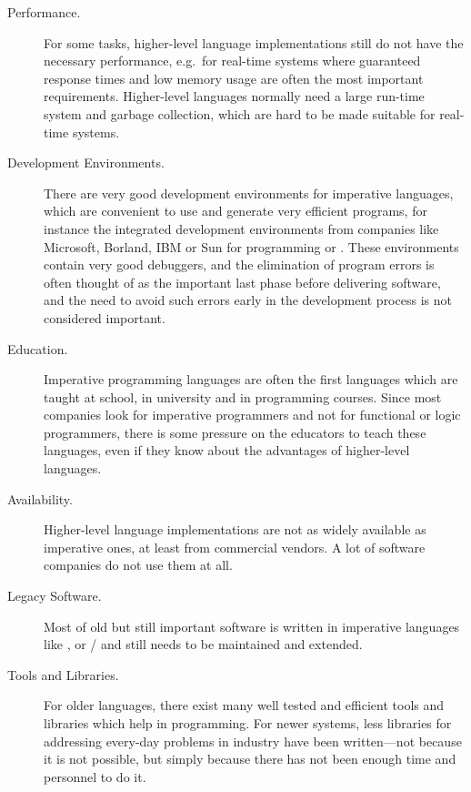 \begin{description}
\item[Performance.] For some tasks, higher-level
  language implementations still do not have the necessary
  performance, e.g.~for real-time systems
  where guaranteed response times and low memory usage are often the
  most important requirements.  Higher-level languages normally need a
  large run-time system and garbage
  collection, which are hard to be made
  suitable for real-time systems.
  
\item[Development Environments.] There
  are very good development environments for imperative languages,
  which are convenient to use and generate very efficient programs,
  for instance the integrated development
  environments from
  companies like Microsoft, Borland,
  IBM or Sun for programming
  \cplusplus{} or \java{}. These environments
  contain very good debuggers, and the elimination of
  program errors is often thought of as the important last phase
  before delivering software, and the need to avoid such errors early
  in the development process is not considered important.
  
\item[Education.]  Imperative programming languages are often the
  first languages which are taught at school, in university and in
  programming courses.  Since most companies look for imperative
  programmers and not for functional or logic programmers, there is
  some pressure on the educators to teach these languages, even if
  they know about the advantages of higher-level languages.

\item[Availability.] Higher-level language implementations are not as
  widely available as imperative ones, at least from commercial
  vendors.  A lot of software companies do not use them at all.
  
\item[Legacy Software.]  Most of old but still important
  software is written in imperative languages like
  \cobol{}, \fortran{} or
  \cee{}/\cplusplus{} and still needs to be
  maintained and extended.
  
\item[Tools and Libraries.] For older languages, there exist many well
  tested and efficient tools and libraries which help in programming.
  For newer systems, less libraries for addressing every-day problems
  in industry have been written---not because it is not possible, but
  simply because there has not been enough time and personnel to do
  it.
  

\end{description}
